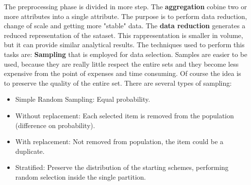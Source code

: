 \documentclass[12pt]{article}
\begin{document}
The preprocessing phase is divided in more step. The \textbf{aggregation} cobine two or more attributes into a single attribute. The purpose is to perform data reduction, change of scale and getting more "stable" data. The \textbf{data reduction} generates a reduced representation of the sataset. This rappresentation is smaller in volume, but it can provide similar analytical results. The techniques used to perform this tasks are:
\textbf{Sampling} that is employed for data selection. Samples are easier to be used, because they are really little respect the entire sets and they become less expensive from the point of expenses and time consuming. Of course the idea is to preserve the quality of the entire set. There are several types of sampling:
\begin{itemize}
  \item Simple Random Sampling: Equal probability.
  \item Without replacement: Each selected item is removed from the population (difference on probability).
  \item With replacement: Not removed from population, the item could be a duplicate.
  \item Stratified: Preserve the distribution of the starting schemes, performing random selection inside the single partition.
\end{itemize}
\end{document}

